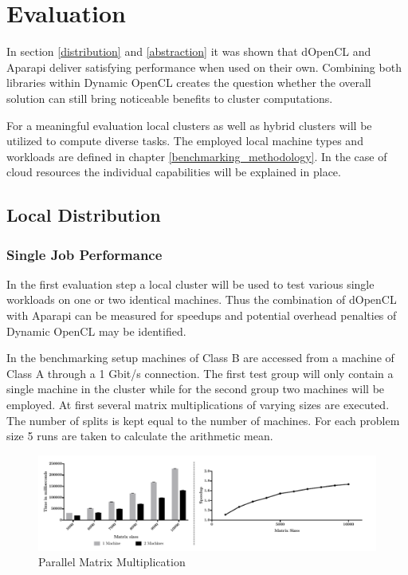 \chapter{Evaluation}

In section \ref{distribution} and \ref{abstraction} it was shown that dOpenCL and Aparapi deliver satisfying performance when used on their own. Combining both libraries within Dynamic OpenCL creates the question whether the overall solution can still bring noticeable benefits to cluster computations.

For a meaningful evaluation local clusters as well as hybrid clusters will be utilized to compute diverse tasks. The employed local machine types and workloads are defined in chapter \ref{benchmarking_methodology}. In the case of cloud resources the individual capabilities will be explained in place.

\section{Local Distribution}

\subsection{Single Job Performance}
\label{single_job_performance}
In the first evaluation step a local cluster will be used to test various single workloads on one or two identical machines. Thus the combination of dOpenCL with Aparapi can be measured for speedups and potential overhead penalties of Dynamic OpenCL may be identified.

In the benchmarking setup machines of Class B are accessed from a machine of Class A through a 1 Gbit/s connection. The first test group will only contain a single machine in the cluster while for the second group two machines will be employed. At first several matrix multiplications of varying sizes are executed. The number of splits is kept equal to the number of machines. For each problem size 5 runs are taken to calculate the arithmetic mean.

\begin{figure}[H]
	
	\includegraphics[width=1.0\textwidth]{images/sharded_matrix_multi.pdf}
	\centering
	\caption{Parallel Matrix Multiplication}
	\label{img:parallel_matrix}
\end{figure}

